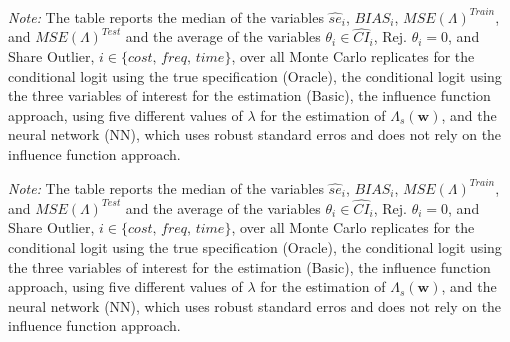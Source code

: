 \documentclass[a4paper, 12pt]{article}
\begin{document}
\begin{appendix}
\begin{table}[H]
\centering
\captionsetup{justification=centering}
	\caption{Median Summary Statistics of 1000 Monte Carlo Replicates for Small Data and without Repeated Sample Splitting}
	\label{tab:MC_swissmetroMedian}
	\small

\begin{minipage}{0.825\textwidth} %
		{   \footnotesize \begin{singlespace}
\textit{Note:} The table reports the median of the variables $\hat{se}_i$, $BIAS_i$,  $MSE(\Lambda)^{Train}$, and $MSE(\Lambda)^{Test}$  and the average of the variables $ \theta_{i} \in \hat{CI}_{i}$, Rej. $\theta_{i}=0$, and Share Outlier, $i \in \{cost,\, freq,\, time\}$,  over all Monte Carlo replicates for the conditional logit using the true specification (Oracle), the conditional logit using the three variables of interest for the estimation (Basic),  the influence function approach, using five different values of $\lambda$ for the estimation of  $\Lambda_s(\bm{w})$, and the neural network (NN), which uses robust standard erros and does not rely on the influence function approach. 
			\end{singlespace}
			\par}
	\end{minipage}
\end{table}



\begin{table}[H]
\centering
\captionsetup{justification=centering}
	\caption{Median Summary Statistics of 1000 Monte Carlo Replicates for Small Data and Repeated Sample Splitting with $R=5$}
	\label{tab:MC_swissmetroMedian}
	\small

\begin{minipage}{0.825\textwidth} %
		{   \footnotesize \begin{singlespace}
\textit{Note:}	The table reports the median of the variables $\hat{se}_i$, $BIAS_i$,  $MSE(\Lambda)^{Train}$, and $MSE(\Lambda)^{Test}$  and the average of the variables $ \theta_{i} \in \hat{CI}_{i}$, Rej. $\theta_{i}=0$, and Share Outlier, $i \in \{cost,\, freq,\, time\}$, over all Monte Carlo replicates for the conditional logit using the true specification (Oracle), the conditional logit using the three variables of interest for the estimation (Basic),  the influence function approach, using five different values of $\lambda$ for the estimation of  $\Lambda_s(\bm{w})$, and the neural network (NN), which uses robust standard erros and does not rely on the influence function approach.
			\end{singlespace}
			\par}
	\end{minipage}
\end{table}



\end{appendix}
\end{document}
